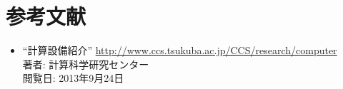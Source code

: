 \section{参考文献}
\begin{itemize}
	\item ``計算設備紹介'' \url{http://www.ccs.tsukuba.ac.jp/CCS/research/computer}	\\
		著者: 計算科学研究センター	\\
		閲覧日: 2013年9月24日
\end{itemize}
